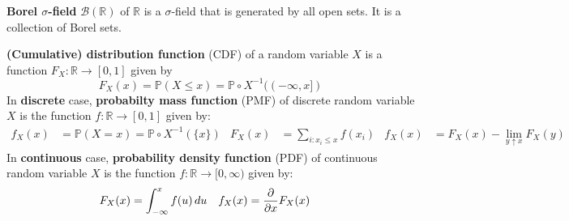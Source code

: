 \documentclass{huhtakm-template-book}
\newcommand{\prob}{\mathbb{P}}
\begin{document}
    \begin{sdefn}
        \textbf{Borel $\sigma$-field} $\mathcal{B}(\mathbb{R})$ of $\mathbb{R}$ is a $\sigma$-field that is generated by all open sets. It is a collection of Borel sets.
    \end{sdefn}
    \begin{sdefn}
        \textbf{(Cumulative) distribution function} (CDF) of a random variable $X$ is a function $F_{X}:\mathbb{R}\to[0,1]$ given by
        \begin{equation*}
            F_{X}(x)=\prob(X\leq x)=\prob\circ X^{-1}((-\infty,x])
        \end{equation*}
        In \textbf{discrete} case, \textbf{probabilty mass function} (PMF) of discrete random variable $X$ is the function $f:\mathbb{R}\to[0,1]$ given by:
        \begin{align*}
            f_{X}(x)&=\prob(X=x)=\prob\circ X^{-1}(\{x\}) & F_{X}(x)&=\sum_{i:x_{i}\leq x}f(x_{i}) & f_{X}(x)&=F_{X}(x)-\lim_{y\uparrow x}F_{X}(y)
        \end{align*}
        In \textbf{continuous} case, \textbf{probability density function} (PDF) of continuous random variable $X$ is the function $f:\mathbb{R}\to[0,\infty)$ given by:
        \begin{align*}
            F_{X}(x)&=\int_{-\infty}^{x}f(u)\,du & f_{X}(x)&=\pdv*{F_{X}(x)}{x}
        \end{align*}
    \end{sdefn}
\end{document}
